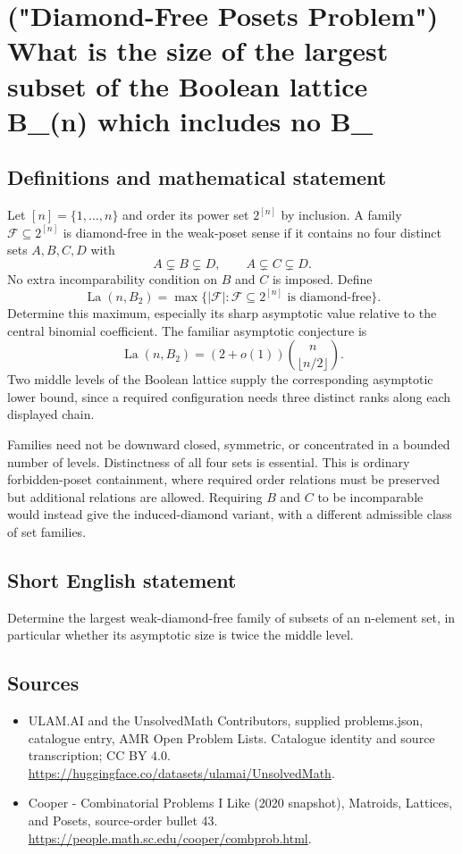 \documentclass[11pt,a4paper]{article}
\begin{document}
\section*{("Diamond-Free Posets Problem") What is the size of the largest subset of the Boolean lattice B\_(n) which includes no B\_}\label{statement}

\subsection{Definitions and mathematical statement}
Let $[n]=\{1,\ldots,n\}$ and order its power set $2^{[n]}$ by
inclusion. A family $\mathcal F\subseteq2^{[n]}$ is diamond-free
in the weak-poset sense if it contains no four distinct sets
$A,B,C,D$ with
\[
                 A\subsetneq B\subsetneq D,
              \qquad A\subsetneq C\subsetneq D.
\]
No extra incomparability condition on $B$ and $C$ is imposed.
Define
\[
 \operatorname{La}(n,B_2)
   =\max\{|\mathcal F|:\mathcal F\subseteq2^{[n]}
                              \text{ is diamond-free}\}.
\]
Determine this maximum, especially its sharp asymptotic value
relative to the central binomial coefficient. The familiar
asymptotic conjecture is
\[
      \operatorname{La}(n,B_2)
              =(2+o(1))\binom n{\lfloor n/2\rfloor}.
\]
Two middle levels of the Boolean lattice supply the corresponding
asymptotic lower bound, since a required configuration needs
three distinct ranks along each displayed chain.

Families need not be downward closed, symmetric, or concentrated
in a bounded number of levels. Distinctness of all four sets is
essential. This is ordinary forbidden-poset containment, where
required order relations must be preserved but additional
relations are allowed. Requiring $B$ and $C$ to be incomparable
would instead give the induced-diamond variant, with a different
admissible class of set families.
\subsection{Short English statement}
Determine the largest weak-diamond-free family of subsets of an n-element set, in particular whether its asymptotic size is twice the middle level.
\subsection{Sources}
\begin{itemize}
\item[S1] ULAM.AI and the UnsolvedMath Contributors, supplied problems.json, catalogue entry, AMR Open Problem Lists. Catalogue identity and source transcription; CC BY 4.0.
\url{https://huggingface.co/datasets/ulamai/UnsolvedMath}.
\item[S2] Cooper - Combinatorial Problems I Like (2020 snapshot), Matroids, Lattices, and Posets, source-order bullet 43. 
\url{https://people.math.sc.edu/cooper/combprob.html}.
\end{itemize}
\end{document}
